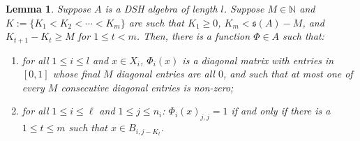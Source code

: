 \documentclass[12pt]{amsart}
\numberwithin{equation}{section}
\newtheorem{lemma}[theorem]{Lemma}
\theoremstyle{definition}
\theoremstyle{remark}
\newcommand{\NN}{\mathbb{N}}
\begin{document}
\begin{lemma}
	\label{indicatorprep}
	Suppose $A$ is a DSH algebra of length $ l $. Suppose $M\in\NN$ and $K:=\{K_{1}< K_{2}<\cdots<K_{m}\}$ are such that $K_{1}\geq 0$, $K_{m}<\mathfrak{s}(A)-M$, and $K_{t+1}-K_{t}\geq M$ for $1\leq t < m$. Then, there is a function $\Phi\in A$ such that:
	\begin{enumerate}
		\item for all $1\leq i\leq  l $ and $x\in X_{i}$, $\Phi_{i}(x)$ is a diagonal matrix with entries in $[0,1]$ whose final $M$ diagonal entries are all $0$, and such that at most one of every $M$ consecutive diagonal entries is non-zero;
		\item for all $1\leq i\leq \ell$ and $1\leq j\leq n_{i}$: $\Phi_{i}(x)_{j,j}=1$ if and only if there is a $1\leq t\leq m$ such that $x\in B_{i,j-K_{t}}$. 
	\end{enumerate}
\end{lemma}
\end{document}
